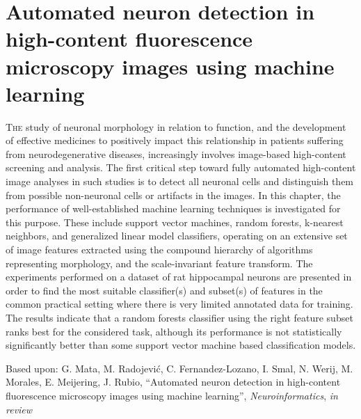 %
%
\chpos{15mm}{8mm}
\chapter[Automated neuron detection in high-content fluorescence microscopy images using machine learning]{Automated neuron detection in high-content fluorescence microscopy images using machine learning}
\label{ch5:ndetchml}
{\small \lettrine{T}{he} study of neuronal morphology in relation to function, and the development of effective medicines to positively impact this relationship in patients suffering from neurodegenerative diseases, increasingly involves image-based high-content screening and analysis. The first critical step toward fully automated high-content image analyses in such studies is to detect all neuronal cells and distinguish them from possible non-neuronal cells or artifacts in the images. In this chapter, the performance of well-established machine learning techniques is investigated for this purpose. These include support vector machines, random forests, k-nearest neighbors, and generalized linear model classifiers, operating on an extensive set of image features extracted using the compound hierarchy of algorithms representing morphology, and the scale-invariant feature transform. The experiments performed on a dataset of rat hippocampal neurons are presented in order to find the most suitable classifier(s) and subset(s) of features in the common practical setting where there is very limited annotated data for training. The results indicate that a random forests classifier using the right feature subset ranks best for the considered task, although its performance is not statistically significantly better than some support vector machine based classification models.\par}
\vspace*{12em}
\begin{publish}
	Based upon: G. Mata, M. Radojevi\'{c}, C. Fernandez-Lozano, I. Smal, N. Werij, M. Morales, E. Meijering, J. Rubio, ``Automated neuron detection in high-content fluorescence microscopy images using machine learning'', \textit{Neuroinformatics}, \textit{in review}%
\end{publish}

